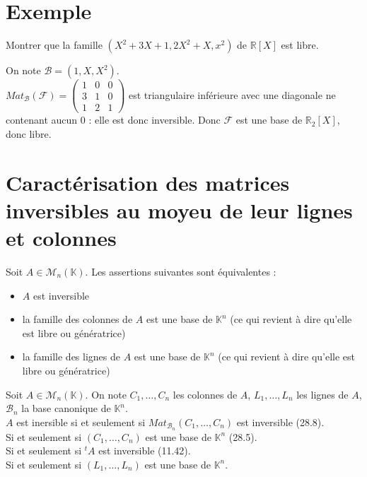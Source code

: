 \documentclass[../main.tex]{subfiles}
\begin{document}
\section{Exemple}
\begin{tcolorbox}[title=Exemple 28.6, title filled=false, colframe=darkgreen, colback=darkgreen!10!white]
    Montrer que la famille $(X^2 + 3X + 1, 2X^2 + X, x^2)$ de $\mathbb{R}[X]$ est libre. 
\end{tcolorbox}

\noindent On note $\mathcal{B} = (1, X, X^2)$. \\
$Mat_{\mathcal{B}}(\mathcal{F}) = \begin{pmatrix}
    1 & 0 & 0 \\
    3 & 1 & 0 \\
    1 & 2 & 1
\end{pmatrix}$ est triangulaire inférieure avec une diagonale ne contenant aucun $0$ : elle est donc inversible. Donc $\mathcal{F}$ est une base de $\mathbb{R}_2[X]$, donc libre. 

\section{Caractérisation des matrices inversibles au moyeu de leur lignes et colonnes}
\begin{tcolorbox}[title=Théorème 28.9, title filled=false, colframe=orange, colback=orange!10!white]
    Soit $A\in \mathcal{M}_n(\mathbb{K})$. Les assertions suivantes sont équivalentes : 
    \begin{itemize}
        \item $A$ est inversible
        \item la famille des colonnes de $A$ est une base de $\mathbb{K}^n$ (ce qui revient à dire qu'elle est libre ou génératrice)
        \item la famille des lignes de $A$ est une base de $\mathbb{K}^n$ (ce qui revient à dire qu'elle est libre ou génératrice)
    \end{itemize}
\end{tcolorbox}

\noindent Soit $A\in \mathcal{M}_n(\mathbb{K})$. On note $C_1, \ldots, C_n$ les colonnes de $A$, $L_1, \ldots, L_n$ les lignes de $A$, $\mathcal{B}_n$ la base canonique de $\mathbb{K}^n$. \\
$A$ est inersible si et seulement si $Mat_{\mathcal{B}_n}(C_1, \ldots, C_n)$ est inversible (28.8). \\
Si et seulement si $(C_1, \ldots, C_n)$ est une base de $\mathbb{K}^n$ (28.5). \\
Si et seulement si $^tA$ est inversible (11.42). \\
Si et seulement si $(L_1, \ldots, L_n)$ est une base de $\mathbb{K}^n$. \\
\end{document}
